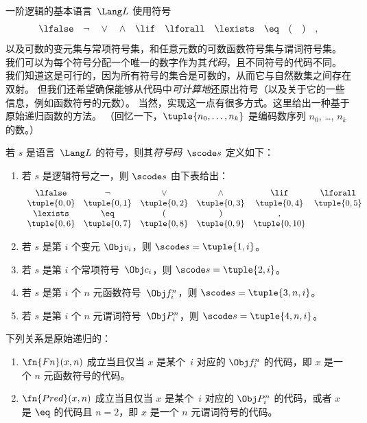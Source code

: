 \documentclass[../../../include/open-logic-section]{subfiles}
\begin{document}

一阶逻辑的基本语言~$\Lang L$ 使用符号
\[
\lfalse \quad \lnot \quad \lor \quad \land \quad \lif \quad \lforall
\quad \lexists \quad \eq \quad ( \quad ) \quad ,
\]
以及可数的变元集与常项符号集，和任意元数的可数函数符号集与谓词符号集。
我们可以为每个符号分配一个唯一的数字作为其\emph{代码}，且不同符号的代码不同。
我们知道这是可行的，因为所有符号的集合是可数的，从而它与自然数集之间存在双射。
但我们还希望确保能够从代码中\emph{可计算地}还原出符号（以及关于它的一些信息，例如函数符号的元数）。
当然，实现这一点有很多方式。这里给出一种基于原始递归函数的方法。
（回忆一下，$\tuple{n_0, \dots, n_k}$ 是编码数序列 $n_0$, \dots, $n_k$ 的数。）

\begin{defn}
若 $s$ 是语言~$\Lang L$ 的符号，则其\emph{符号码}~$\scode s$ 定义如下：
\begin{enumerate}
\item 若 $s$ 是逻辑符号之一，则 $\scode s$ 由下表给出：
\[
\begin{array}{cccccccccc}
  \lfalse & \lnot & \lor & \land & \lif & \lforall \\
\tuple{0, 0} & \tuple{0, 1} & \tuple{0, 2} & \tuple{0, 3} &
\tuple{0, 4} & \tuple{0, 5} \\
\lexists & \eq & ( & ) & ,\\
\tuple{0, 6} & \tuple{0, 7} &
\tuple{0, 8} & \tuple{0, 9} & \tuple{0, 10}
\end{array}
\]
\item 若 $s$ 是第 $i$ 个变元 $\Obj v_i$，则 $\scode s = \tuple{1, i}$。
\item 若 $s$ 是第 $i$ 个常项符号~$\Obj c_i$，则
  $\scode s = \tuple{2, i}$。
\item 若 $s$ 是第 $i$ 个 $n$ 元函数符号~$\Obj f_i^n$，则
  $\scode s = \tuple{3, n, i}$。
\item 若 $s$ 是第 $i$ 个 $n$ 元谓词符号~$\Obj P_i^n$，则
  $\scode s = \tuple{4, n, i}$。
\end{enumerate}
\end{defn}

\begin{prop}
下列关系是原始递归的：
\begin{enumerate}
\item $\fn{Fn}(x, n)$ 成立当且仅当 $x$ 是某个~$i$ 对应的 $\Obj f^n_i$ 的代码，即 $x$ 是一个 $n$ 元函数符号的代码。
\item $\fn{Pred}(x, n)$ 成立当且仅当 $x$ 是某个~$i$ 对应的 $\Obj P^n_i$ 的代码，或者 $x$ 是 $\eq$ 的代码且 $n = 2$，即 $x$ 是一个 $n$ 元谓词符号的代码。
\end{enumerate}
\end{prop}
\end{document}

